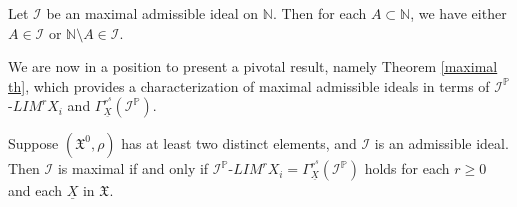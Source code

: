 \documentclass[reqno]{amsart}
\begin{document}
	\begin{lemma}\cite[Lemma 5.1]{kostyrko2000convergence}\label{lemma maximal}
		Let $\mathcal{I}$ be an maximal admissible ideal on $\mathbb{N}$. Then for each $A\subset\mathbb{N}$, we have either $A\in\mathcal{I}$ or $\mathbb{N}\setminus A\in\mathcal{I}$.
	\end{lemma}
We are now in a position to present a pivotal result, namely Theorem \ref{maximal th}, which provides a characterization of maximal admissible ideals in terms of $\mathcal{I}^{\mathbb{P}}$-$LIM^rX_i$ and $\Gamma^{r^s}_{\underline{X}}(\mathcal{I}^{\mathbb{P}})$.
\begin{theorem}\label{maximal th}
Suppose $(\mathfrak{X}^0, \rho)$ has at least two distinct elements, and $\mathcal{I}$ is an admissible ideal. Then $\mathcal{I}$ is maximal if and only if $\mathcal{I}^{\mathbb{P}}$-$LIM^rX_i=\Gamma^{r^s}_{\underline{X}}(\mathcal{I}^{\mathbb{P}})$ holds for each $r\geq 0$ and each $\underline{X}$ in $\mathfrak{X}$.
\end{theorem}
\end{document}
